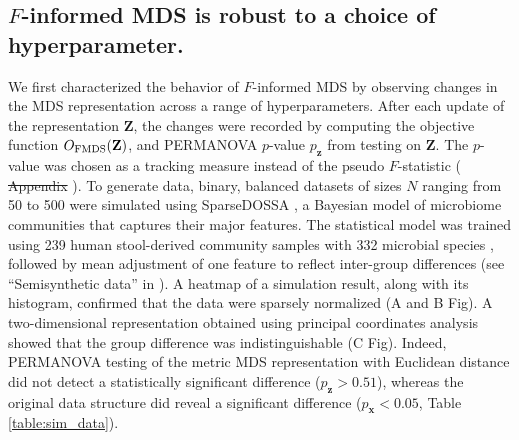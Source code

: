 \documentclass[10pt,letterpaper]{article}
\newcommand{\1}{{\rm 1}\kern-0.24em{\rm I}}
\providecommand{\DIFaddtex}[1]{{\protect\color{blue}\uwave{#1}}} %
\providecommand{\DIFdeltex}[1]{{\protect\color{red}\sout{#1}}}                      %
\providecommand{\DIFaddbegin}{} %
\providecommand{\DIFaddend}{} %
\providecommand{\DIFdelbegin}{} %
\providecommand{\DIFdelend}{} %
\providecommand{\DIFadd}[1]{\texorpdfstring{\DIFaddtex{#1}}{#1}} %
\providecommand{\DIFdel}[1]{\texorpdfstring{\DIFdeltex{#1}}{}} %
\newcommand{\DIFscaledelfig}{0.5}
\newlength{\DIFdelgraphicswidth} %
\newlength{\DIFdelgraphicsheight} %
\newcommand{\DIFaddincludegraphics}[2][]{{\color{blue}\fbox{\DIFOincludegraphics[#1]{#2}}}} %
\newcommand{\DIFdelincludegraphics}[2][]{%
\sbox{\DIFdelgraphicsbox}{\DIFOincludegraphics[#1]{#2}}%
\settoboxwidth{\DIFdelgraphicswidth}{\DIFdelgraphicsbox} %
\settoboxtotalheight{\DIFdelgraphicsheight}{\DIFdelgraphicsbox} %
\scalebox{\DIFscaledelfig}{%
\parbox[b]{\DIFdelgraphicswidth}{\usebox{\DIFdelgraphicsbox}\\[-\baselineskip] \rule{\DIFdelgraphicswidth}{0em}}\llap{\resizebox{\DIFdelgraphicswidth}{\DIFdelgraphicsheight}{%
\setlength{\unitlength}{\DIFdelgraphicswidth}%
\begin{picture}(1,1)%
\thicklines\linethickness{2pt} %
{\color[rgb]{1,0,0}\put(0,0){\framebox(1,1){}}}%
{\color[rgb]{1,0,0}\put(0,0){\line( 1,1){1}}}%
{\color[rgb]{1,0,0}\put(0,1){\line(1,-1){1}}}%
\end{picture}%
}\hspace*{3pt}}} %
} %
\DeclareRobustCommand{\DIFaddbegin}{\DIFOaddbegin \let\includegraphics\DIFaddincludegraphics} %
\DeclareRobustCommand{\DIFaddend}{\DIFOaddend \let\includegraphics\DIFOincludegraphics} %
\DeclareRobustCommand{\DIFdelbegin}{\DIFOdelbegin \let\includegraphics\DIFdelincludegraphics} %
\DeclareRobustCommand{\DIFdelend}{\DIFOaddend \let\includegraphics\DIFOincludegraphics} %
\begin{document}
\subsection*{$F$-informed MDS is robust to a choice of hyperparameter.}
We first characterized the behavior of $F$-informed MDS by observing changes in the MDS representation across a range of hyperparameters. After each update of the representation $\mathbf{Z}$, the changes were recorded by computing the objective function $O_{\rm FMDS}(\mathbf{Z})$, and PERMANOVA $p$-value $p_\mathbf{z}$ from testing on $\mathbf{Z}$. The $p$-value was chosen as a tracking measure instead of the pseudo $F$-statistic (\DIFdelbegin %
\DIFdel{Appendix }\DIFdelend \DIFaddbegin \DIFadd{Appendix A, } \DIFadd{File}\DIFaddend ). To generate data, binary, balanced datasets of sizes $N$ ranging from 50 to 500 were simulated using SparseDOSSA \cite{Ma21}, a Bayesian model of microbiome communities that captures their major features. The statistical model was trained using 239 human stool-derived community samples with 332 microbial species \cite{Lloyd17}, followed by mean adjustment of one feature to reflect inter-group differences (see ``Semisynthetic data'' in ). A heatmap of a simulation result, along with its histogram, confirmed that the data were sparsely normalized (A and B Fig). A two-dimensional representation obtained using principal coordinates analysis showed that the group difference was indistinguishable (C Fig). Indeed, PERMANOVA testing of the metric MDS representation with Euclidean distance did not detect a statistically significant difference ($p_\mathbf{z}>0.51$), whereas the original data structure did reveal a significant difference ($p_\mathbf{x}<0.05$, Table \ref{table:sim_data}).
\end{document}
